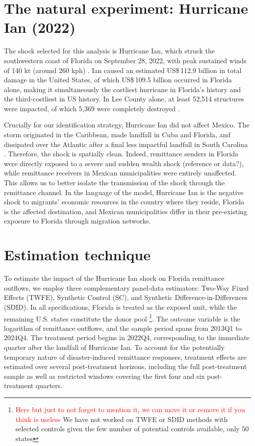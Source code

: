 \section{The natural experiment: Hurricane Ian (2022)}

The shock selected for this analysis is Hurricane Ian, which struck the southwestern coast of Florida on September 28, 2022, with peak sustained winds of 140 kt (around 260 kph) \parencite{nhc_ian_2026}. Ian caused an estimated US\$\,112.9 billion in total damage in the United States, of which US\$\,109.5 billion occurred in Florida alone, making it simultaneously the costliest hurricane in Florida's history and the third-costliest in US history. In Lee County alone, at least 52,514 structures were impacted, of which 5,369 were completely destroyed \parencite{nhc_ian_2026}.

\par

Crucially for our identification strategy, Hurricane Ian did not affect Mexico. The storm originated in the Caribbean, made landfall in Cuba and Florida, and dissipated over the Atlantic after a final less impactful landfall in South Carolina \parencite{nhc_ian_2026}. Therefore, the shock is spatially clean. Indeed, remittance senders in Florida were directly exposed to a severe and sudden wealth shock (reference or data?), while remittance receivers in Mexican municipalities were entirely unaffected. This allows us to better isolate the transmission of the shock through the remittance channel. In the language of the model, Hurricane Ian is the negative shock to migrants' economic resources in the country where they reside, Florida is the affected destination, and Mexican municipalities differ in their pre-existing exposure to Florida through migration networks.

\section{Estimation technique}

To estimate the impact of the Hurricane Ian shock on Florida remittance outflows, we employ three complementary panel-data estimators: Two-Way Fixed Effects (TWFE), Synthetic Control (SC), and Synthetic Difference-in-Differences (SDID). In all specifications, Florida is treated as the exposed unit, while the remaining U.S. states constitute the donor pool \footnote{\textcolor{red}{Here but just to not forget to mention it, we can move it or remove it if you think is useless} We have not worked on TWFE or SDID methods with selected controls given the few number of potential controls available, only 50 states}. The outcome variable is the logarithm of remittance outflows, and the sample period spans from 2013Q1 to 2024Q4. The treatment period begins in 2022Q4, corresponding to the immediate quarter after the landfall of Hurricane Ian. To account for the potentially temporary nature of disaster-induced remittance responses, treatment effects are estimated over several post-treatment horizons, including the full post-treatment sample as well as restricted windows covering the first four and six post-treatment quarters. 

